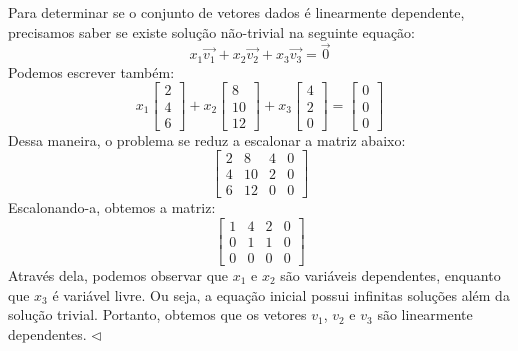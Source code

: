 \begin{resol}
Para determinar se o conjunto de vetores dados é linearmente dependente, precisamos saber se existe solução não-trivial na seguinte equação:
\begin{equation}
  x_1\vec{v_1} + x_2\vec{v_2} + x_3\vec{v_3}  = \vec{0}
\end{equation}
Podemos escrever também:
\begin{equation}
x_1\left[
  \begin{array}{c}
  2 \\
  4 \\
  6 
  \end{array}
\right] +
x_2\left[
  \begin{array}{c}
  8 \\
  10 \\
  12
  \end{array}
\right] +
x_3\left[
  \begin{array}{c}
  4 \\
  2 \\
  0 
  \end{array}
\right] = 
\left[
  \begin{array}{c}
  0 \\
  0 \\
  0 
  \end{array}
\right]
\end{equation}
Dessa maneira, o problema se reduz a escalonar a matriz abaixo:
\begin{equation}
 \left[
  \begin{array}{cccc}
     2 & 8 & 4 & 0 \\
     4 & 10 & 2 & 0 \\
     6 & 12 & 0 & 0
  \end{array}
\right]
\end{equation}
Escalonando-a, obtemos a matriz:
\begin{equation}
 \left[
  \begin{array}{cccc}
     1 & 4 & 2 & 0 \\
     0 & 1 & 1 & 0 \\
     0 & 0 & 0 & 0
  \end{array}
\right]
\end{equation}
Através dela, podemos observar que $x_1$ e $x_2$ são variáveis dependentes, enquanto que $x_3$ é variável livre. Ou seja, a equação
inicial possui infinitas soluções além da solução trivial. Portanto, obtemos que os vetores $v_1$, $v_2$ e $v_3$ são linearmente dependentes. $\lhd$
\end{resol}
